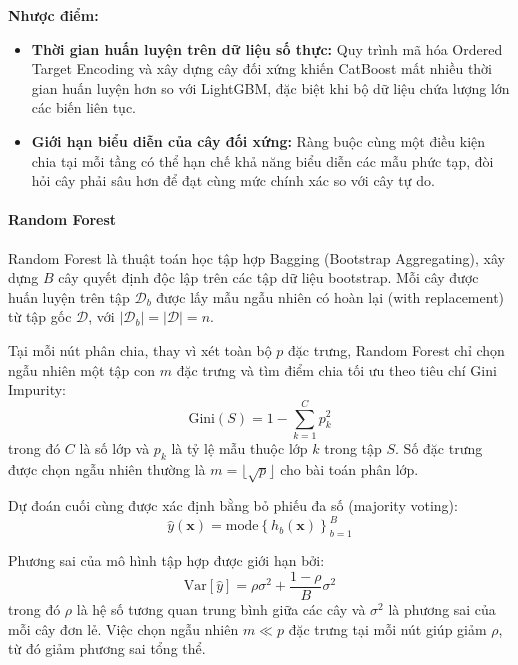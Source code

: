 \textbf{Nhược điểm:}
\begin{itemize}
    \item \textbf{Thời gian huấn luyện trên dữ liệu số thực:} Quy trình mã hóa Ordered Target Encoding và xây dựng cây đối xứng khiến CatBoost mất nhiều thời gian huấn luyện hơn so với LightGBM, đặc biệt khi bộ dữ liệu chứa lượng lớn các biến liên tục.
    \item \textbf{Giới hạn biểu diễn của cây đối xứng:} Ràng buộc cùng một điều kiện chia tại mỗi tầng có thể hạn chế khả năng biểu diễn các mẫu phức tạp, đòi hỏi cây phải sâu hơn để đạt cùng mức chính xác so với cây tự do.
\end{itemize}

\paragraph{Random Forest}\hspace{1cm}

Random Forest là thuật toán học tập hợp Bagging (Bootstrap Aggregating), xây dựng $B$ cây quyết định độc lập trên các tập dữ liệu bootstrap. Mỗi cây được huấn luyện trên tập $\mathcal{D}_b$ được lấy mẫu ngẫu nhiên có hoàn lại (with replacement) từ tập gốc $\mathcal{D}$, với $|\mathcal{D}_b| = |\mathcal{D}| = n$.

Tại mỗi nút phân chia, thay vì xét toàn bộ $p$ đặc trưng, Random Forest chỉ chọn ngẫu nhiên một tập con $m$ đặc trưng và tìm điểm chia tối ưu theo tiêu chí Gini Impurity:
\begin{equation*}
    \text{Gini}(S) = 1 - \sum_{k=1}^{C} p_k^2
\end{equation*}
trong đó $C$ là số lớp và $p_k$ là tỷ lệ mẫu thuộc lớp $k$ trong tập $S$. Số đặc trưng được chọn ngẫu nhiên thường là $m = \lfloor\sqrt{p}\rfloor$ cho bài toán phân lớp.

Dự đoán cuối cùng được xác định bằng bỏ phiếu đa số (majority voting):
\begin{equation*}
    \hat{y}(\mathbf{x}) = \text{mode}\left\{ h_b(\mathbf{x}) \right\}_{b=1}^{B}
\end{equation*}

Phương sai của mô hình tập hợp được giới hạn bởi:
\begin{equation*}
    \text{Var}\left[\hat{y}\right] = \rho \sigma^2 + \frac{1 - \rho}{B} \sigma^2
\end{equation*}
trong đó $\rho$ là hệ số tương quan trung bình giữa các cây và $\sigma^2$ là phương sai của mỗi cây đơn lẻ. Việc chọn ngẫu nhiên $m \ll p$ đặc trưng tại mỗi nút giúp giảm $\rho$, từ đó giảm phương sai tổng thể.\\

